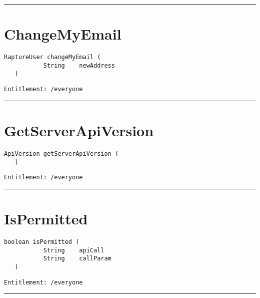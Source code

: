 \rule{12cm}{2pt}
\section{ChangeMyEmail}
\label{Api:ChangeMyEmail}
\begin{lstlisting}[style=nonumbers]
   RaptureUser changeMyEmail (
           String    newAddress
   )
\end{lstlisting}
\begin{Verbatim}[formatcom=\color{Maroon}]
  Entitlement: /everyone
\end{Verbatim}



\rule{12cm}{2pt}
\section{GetServerApiVersion}
\label{Api:GetServerApiVersion}
\begin{lstlisting}[style=nonumbers]
   ApiVersion getServerApiVersion (
   )
\end{lstlisting}
\begin{Verbatim}[formatcom=\color{Maroon}]
  Entitlement: /everyone
\end{Verbatim}



\rule{12cm}{2pt}
\section{IsPermitted}
\label{Api:IsPermitted}
\begin{lstlisting}[style=nonumbers]
   boolean isPermitted (
           String    apiCall
           String    callParam
   )
\end{lstlisting}
\begin{Verbatim}[formatcom=\color{Maroon}]
  Entitlement: /everyone
\end{Verbatim}



\rule{12cm}{2pt}
